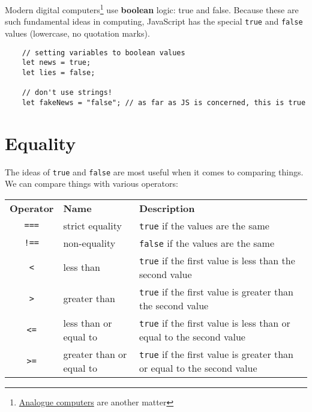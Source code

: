 
Modern digital computers\footnote{\href{https://en.wikipedia.org/wiki/Analog_computer}{Analogue computers} are another matter} use \textbf{boolean} logic: true and false. Because these are such fundamental ideas in computing, JavaScript has the special \texttt{true} and \texttt{false} values (lowercase, no quotation marks).

\begin{verbatim}
    // setting variables to boolean values
    let news = true;
    let lies = false;

    // don't use strings!
    let fakeNews = "false"; // as far as JS is concerned, this is true
\end{verbatim}

\pagebreak

\section{Equality}

The ideas of \texttt{true} and \texttt{false} are most useful when it comes to comparing things.
\\

We can compare things with various operators:
\\

\begin{small}
    \begin{tabularx}{\textwidth}{c l X}
        \textbf{Operator} & \textbf{Name} & \textbf{Description} \\
        \texttt{===} & strict equality & \texttt{true} if the values are the same \\
        \texttt{!==} & non-equality & \texttt{false} if the values are the same\\
        \texttt{<} & less than & \texttt{true} if the first value is less than the second value  \\
        \texttt{>} & greater than & \texttt{true} if the first value is greater than the second value\\
        \texttt{<=} & less than or equal to & \texttt{true} if the first value is less than or equal to the second value  \\
        \texttt{>=} & greater than or equal to & \texttt{true} if the first value is greater than or equal to the second value
    \end{tabularx}
\end{small}


